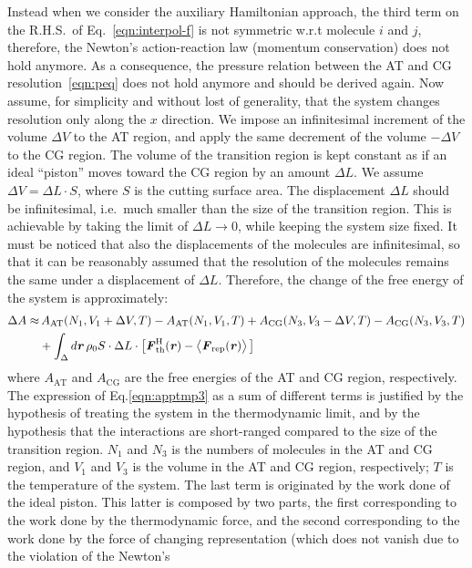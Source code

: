 \documentclass[a4paper,preprint,unsortedaddress]{revtex4-1}
\newcommand{\recheck}[1]{{\color{red} #1}}
\newcommand{\vect}[1]{\textbf{\textit{#1}}}
\newcommand{\AT}{{\textrm{{AT}}}}
\newcommand{\CG}{{\textrm{CG}}}
\newcommand{\thf}{{\textrm{th}}}
\newcommand{\res}{{\textrm{rep}}}
\newcommand{\hadress}{{\textrm{H}}}
\begin{document}
{Instead when we consider the auxiliary Hamiltonian approach, the third term on the R.H.S.~of Eq.~\eqref{eqn:interpol-f} is not
symmetric w.r.t molecule $i$ and $j$, therefore, the Newton's
action-reaction law (momentum conservation) does not hold anymore.
As a consequence, the pressure relation between the AT and CG
resolution~\eqref{eqn:peq} does not hold anymore and should be derived again.
Now assume, \recheck{for simplicity and without lost of generality}, that the system changes resolution only along the $x$ direction.
We impose an infinitesimal increment of the volume $\Delta V$ to the
AT region, and apply the same decrement of the volume $-\Delta V$ to the CG
region.  The volume of the transition region is kept constant as if an ideal ``piston'' moves toward the CG region by an amount $\Delta L$.
We assume $\Delta V = \Delta L\cdot S$, where $S$ is the
cutting surface area.
The displacement $\Delta L$ should be infinitesimal, i.e.~much smaller than the size of the
transition region. This is achievable by taking the limit of $\Delta L\rightarrow 0$,
while keeping the system size fixed.
It must be noticed that also the displacements of the molecules are infinitesimal, so that it can be reasonably assumed that
the resolution of the molecules remains the same under a displacement of $\Delta L$.
Therefore, the change of the free energy of the system is approximately:
\begin{align}\nonumber
  \Delta A \approx&\,
  A_\AT(N_1, V_1+\Delta V, T) -
  A_\AT(N_1, V_1, T)
  +
  A_\CG(N_3, V_3-\Delta V, T) -
  A_\CG(N_3, V_3, T)\\\label{eqn:apptmp3}
  &+
  \int_\Delta d \vect r\, \rho_0 S\cdot \Delta L\cdot
  \big[\vect F^\hadress_\thf(\vect r)
  -
  \big\langle \vect F_\res(\vect r)\big\rangle\,\big]
\end{align}
where $A_\AT$ and $A_\CG$ are the free energies of the AT and CG region, respectively.
The expression of Eq.\ref{eqn:apptmp3} as a sum of different terms is justified by the hypothesis of treating the system in the thermodynamic limit, and by the hypothesis that the interactions are short-ranged compared to the size of the transition region.
$N_1$ and $N_3$ is the numbers of molecules in the AT and CG region, and
$V_1$ and $V_3$ is the volume in the AT and CG region, respectively; $T$ is the temperature
of the system.
The last term is originated by the work done of the ideal piston. This latter is composed by
two parts, the first corresponding to the work done by the thermodynamic force, and the
second corresponding to 
the work done by the force of changing representation (which does not vanish due to the violation of the Newton's
}
\end{document}
